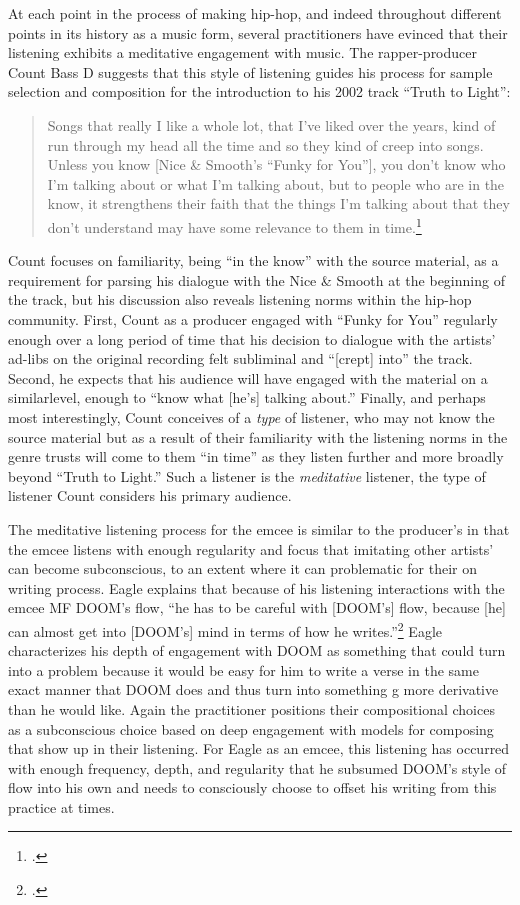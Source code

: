 At each point in the process of making hip-hop, and indeed throughout different points in its history as
a music form, several practitioners have evinced that their listening exhibits a meditative engagement with
music. The rapper-producer Count Bass D suggests that this style of listening guides his process for sample
selection and composition for the introduction to his 2002 track ``Truth to Light'': 
    \begin{quote}
        Songs that really I like a whole lot, that I've liked over the years, kind of run through my head all
        the time and so they kind of creep into songs. \textellipsis Unless you know [Nice \& Smooth's ``Funky
        for You''], you don't know who I'm talking about or what I'm talking about, but to people who are in
        the know, it strengthens their faith that the things I'm talking about that they don't understand may
        have some relevance to them in time.\footnote{
            \autocite[100]{mickeyhessHipHopDead2007}.}
    \end{quote}
Count focuses on familiarity, being ``in the know'' with the source material, as a requirement for parsing 
his dialogue with the Nice \& Smooth at the beginning of the track, but his discussion also reveals listening
norms within the hip-hop community. First, Count as a producer engaged with ``Funky for You'' regularly enough
over a long period of time that his decision to dialogue with the artists' ad-libs on the original recording 
felt subliminal and ``[crept] into'' the track. Second, he expects that his audience will have engaged with 
the material on a similarlevel, enough to ``know what [he's] talking about.'' Finally, and perhaps most 
interestingly, Count conceives of a \emph{type} of listener, who may not know the source material but as a
result of their familiarity with the listening norms in the genre trusts will come to them ``in time'' as
they listen further and more broadly beyond ``Truth to Light.'' Such a listener is the \emph{meditative} 
listener, the type of listener Count considers his primary audience.

The meditative listening process for the emcee is similar to the producer's in that the emcee listens with
enough regularity and focus that imitating other artists' can become subconscious, to an extent where it can
problematic for their on writing process. Eagle explains that because of his listening interactions with the
emcee MF DOOM's flow, ``he has to be  careful with [DOOM's] flow, because [he] can almost get into [DOOM's] 
mind in terms of how he writes.''\footnote{
    \cite{estellecaswellRappingDeconstructedBest2016}.} 
Eagle characterizes his depth of engagement with DOOM as something that could turn into a problem because 
it would be easy for him to write a verse in the same exact manner that DOOM does and thus turn into something
g more derivative than he would like. Again the practitioner positions their compositional choices as a 
subconscious choice based on deep engagement with models for composing that show up in their listening. For 
Eagle as an emcee, this listening has occurred with enough frequency, depth, and regularity that he subsumed
DOOM's style of flow into his own and needs to consciously choose to offset his writing from this practice 
at times.

